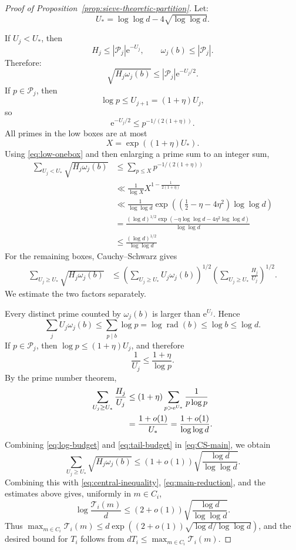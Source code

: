\documentclass[10pt,a4paper]{amsart}
\begin{document}
\begin{proof}[Proof of Proposition~\ref{prop:sieve-theoretic-partition}]
Let:
\begin{equation}
 U_*=\log \log d-4\sqrt{\log \log d}.
\end{equation}

If $U_j<U_*$, then
\[
 H_j\le |\mathcal{P}_j|\mathrm e^{-U_j},
 \qquad \omega_j(b)\le |\mathcal{P}_j|.
\]
Therefore:
\begin{equation}\label{eq:low-onebox}
 \sqrt{H_j\omega_j(b)}\le |\mathcal{P}_j|\mathrm e^{-U_j/2}.
\end{equation}
If $p\in\mathcal P_j$, then
\[
 \log p\le U_{j+1}=(1+\eta)U_j,
\]
so
\[
 \mathrm e^{-U_j/2}\le p^{-1/(2(1+\eta))}.
\]
All primes in the low boxes are at most
\[
 X=\exp((1+\eta)U_*).
\]
Using \eqref{eq:low-onebox} and then enlarging a prime sum to an integer sum,
\begin{align*}
 \sum_{U_j<U_*}\sqrt{H_j\omega_j(b)}
 &\le \sum_{p\le X}p^{-1/(2(1+\eta))}\\
 &\ll \frac{1}{\log X} X^{1-\frac{1}{2(1+\eta)}}\\
 &\ll \frac{1}{\log \log d}
 \exp\!\left(\left(\frac12-\eta-4\eta^2\right)\log\log d\right)\\
 &= \frac{(\log d)^{1/2} \exp(- \eta \log \log d - 4 \eta^2 \log \log d) }{\log \log d} \\
 &\leq \frac{(\log d)^{1/2}}{\log \log d}
\end{align*}
For the remaining boxes, Cauchy--Schwarz gives
\begin{align}
 \sum_{U_j\ge U_*}\sqrt{H_j\omega_j(b)}
 &\le
 \left(\sum_{U_j\ge U_*}U_j\omega_j(b)\right)^{1/2}
 \left(\sum_{U_j\ge U_*}\frac{H_j}{U_j}\right)^{1/2}.
\label{eq:CS-main}
\end{align}
We estimate the two factors separately.

Every distinct prime counted by $\omega_j(b)$ is larger than $\mathrm e^{U_j}$. Hence
\begin{equation}\label{eq:log-budget}
 \sum_jU_j\omega_j(b)
 \le\sum_{p\mid b}\log p
 =\log\operatorname{rad}(b)
 \le\log b
 \le \log d.
\end{equation}
If $p\in\mathcal P_j$, then $\log p\le(1+\eta)U_j$, and therefore
\[
 \frac1{U_j}\le\frac{1+\eta}{\log p}.
\]
By the prime number theorem,
\begin{align}
 \sum_{U_j\ge U_*}\frac{H_j}{U_j}
 &\le(1+\eta)\sum_{p>\mathrm e^{U_*}}\frac1{p\log p}\notag\\
 &=\frac{1+o(1)}{U_*}
 =\frac{1+o(1)}{\log \log d}.
\label{eq:tail-budget}
\end{align}
Combining \eqref{eq:log-budget} and \eqref{eq:tail-budget} in
\eqref{eq:CS-main}, we obtain
\begin{equation}
 \sum_{U_j\ge U_*}\sqrt{H_j\omega_j(b)}
 \le(1+o(1))\sqrt{\frac{\log d}{\log \log d}}.
\end{equation}
Combining this with \eqref{eq:central-inequality}, \eqref{eq:main-reduction}, and the estimates above gives, uniformly in $m\in C_i$,
\[
  \log\frac{\mathcal T_i(m)}d
  \leq (2+o(1))\sqrt{\frac{\log d}{\log\log d}}.
\]
Thus $\max_{m\in C_i}\mathcal T_i(m)\leq d\exp((2+o(1))\sqrt{\log d/\log\log d})$, and the desired bound for $T_i$ follows from $dT_i\leq \max_{m\in C_i}\mathcal T_i(m)$.
\end{proof}
\end{document}
